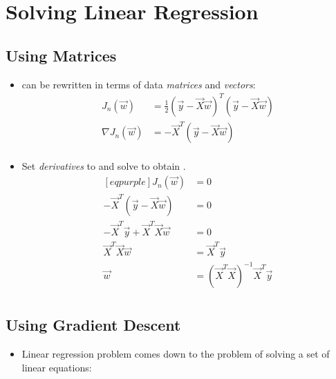 \documentclass[
	number={5},
	title={Linear Regression}
]{cs584notes}
\begin{document}
\section{Solving Linear Regression}\label{sec:solving-linear-regression}
\subsection{Using Matrices}\label{subsec:using-matrices}
\begin{itemize}
	\item {} can be rewritten in terms of data \emph{matrices}  and \emph{vectors}:
	\begin{equation*}
	\begin{aligned}
		J_{n}(\vec{w}) &= \frac{1}{2}(\vec{y} - \vec{X}\vec{w})^{T}(\vec{y} - \vec{X}\vec{w})\\
		\nabla J_{n}(\vec{w}) &= -\vec{X}^{T}(\vec{y} - \vec{X}\vec{w})\\
	\end{aligned}
	\end{equation*}
	\item Set \emph{derivatives} to  and solve to obtain .
	\begin{equation*}
	\begin{aligned}[eqpurple]
		J_{n}(\vec{w}) &= 0\\
		-\vec{X}^{T}(\vec{y} - \vec{X}\vec{w}) &= 0\\
		-\vec{X}^{T}\vec{y} + \vec{X}^{T}\vec{X}\vec{w} &= 0\\
		\vec{X}^{T}\vec{X}\vec{w} &= \vec{X}^{T}\vec{y}\\
		\vec{w} &= \left( \vec{X}^{T}\vec{X} \right)^{-1}\vec{X}^{T}\vec{y}\\
	\end{aligned}
	\end{equation*}
\end{itemize}

\subsection{Using Gradient Descent}\label{subsec:using-gradient-descent}
\begin{itemize}
	\item Linear regression problem comes down to the problem of solving a set of linear equations:
\end{itemize}
\end{document}
